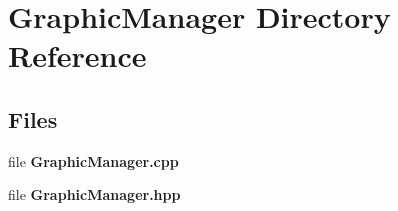 \section{Graphic\+Manager Directory Reference}
\label{dir_c3170edb53ab5738caf67369f45a1972}
\subsection*{Files}
\begin{DoxyCompactItemize}
\item 
file \textbf{ Graphic\+Manager.\+cpp}
\item 
file \textbf{ Graphic\+Manager.\+hpp}
\end{DoxyCompactItemize}
